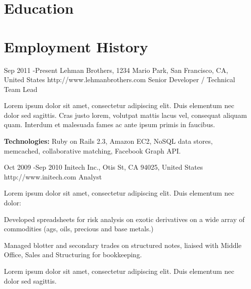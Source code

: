 \documentclass[10pt]{article} %
\begin{document}

\section{Education}





\section{Employment History}

\job
{Sep 2011 -}{Present}
{Lehman Brothers, 1234 Mario Park, San Francisco, CA, United States}
{http://www.lehmanbrothers.com}
{Senior Developer / Technical Team Lead}
{Lorem ipsum dolor sit amet, consectetur adipiscing elit. Duis elementum nec dolor sed sagittis. Cras justo lorem, volutpat mattis lacus vel, consequat aliquam quam. Interdum et malesuada fames ac ante ipsum primis in faucibus.\\
\rule{0mm}{5mm}\textbf{Technologies:} Ruby on Rails 2.3, Amazon EC2, NoSQL data stores, memcached, collaborative matching, Facebook Graph API.}


\job
{Oct 2009 -}{Sep 2010}
{Initech Inc., Otis St, CA 94025, United States}
{http://www.initech.com}
{Analyst}
{Lorem ipsum dolor sit amet, consectetur adipiscing elit. Duis elementum nec dolor:

\begin{itemize-noindent}
\item{Developed spreadsheets for risk analysis on exotic derivatives on a wide array of commodities (ags, oils, precious and base metals.)}
\item{Managed blotter and secondary trades on structured notes, liaised with Middle Office, Sales and Structuring for bookkeeping.}
\end{itemize-noindent}

Lorem ipsum dolor sit amet, consectetur adipiscing elit. Duis elementum nec dolor sed sagittis.}
\end{document}
